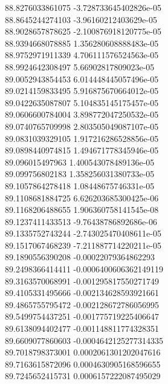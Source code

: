 {88.8276033861075 -3.728733645402826e-05 \\
88.8645244274103 -3.96160212403629e-05 \\
88.9028657878625 -2.100876918120775e-05 \\
88.9394668078885 1.356280608888483e-05 \\
88.9752971911339 4.706111576524563e-05 \\
88.9924642308497 5.66902817809023e-05 \\
89.0052943854453 6.014448445057496e-05 \\
89.0214159833495 5.916875670664012e-05 \\
89.0422635087807 5.104835145175457e-05 \\
89.0606600784004 3.898772047250532e-05 \\
89.0740765709998 2.803505049087107e-05 \\
89.0831039329105 1.917216286528856e-05 \\
89.0898440974815 1.494671778345946e-05 \\
89.096015497963 1.400543078489136e-05 \\
89.099756802183 1.358256031380733e-05 \\
89.1057864278418 1.08448675746331e-05 \\
89.1108681884725 6.626203685300425e-06 \\
89.1168206488655 1.906360758141545e-08 \\
89.1237411433513 -9.76438786892686e-06 \\
89.1335752743244 -2.743025470408611e-05 \\
89.1517067468239 -7.211887714220211e-05 \\
89.1890556390208 -0.00022079364862293 \\
89.2498366414411 -0.0006400606362149119 \\
89.3163570068991 -0.001295817550271749 \\
89.4105331495666 -0.002134628593921661 \\
89.4865755795472 -0.002128672786056995 \\
89.5499754437251 -0.001775719225406647 \\
89.6138094402477 -0.001148811774328351 \\
89.6609077860603 -0.0004642125277314335 \\
89.7018798373001 0.0002061301202047616 \\
89.7163615872096 0.0004630905168596655 \\
89.7245652415731 0.0006157222087495029 \\
}
